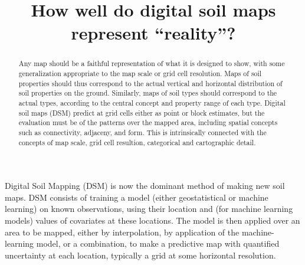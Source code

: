 \documentclass[soil, manuscript]{copernicus}
\begin{document}
\title{How well do digital soil maps represent ``reality''?}








\received{}
\pubdiscuss{} %
\revised{}
\accepted{}
\published{}



\maketitle
\tableofcontents

\newpage
\begin{abstract}
Any map should be a faithful representation of what it is designed to show, with some generalization appropriate to the map scale or grid cell resolution.
%
Maps of soil properties should thus correspond to the actual vertical and horizontal distribution of soil properties on the ground.
%
Similarly, maps of soil types should correspond to the actual types, according to the central concept and property range of each type.
%
Digital soil maps (DSM) predict at grid cells either as point or block estimates, but the evaluation must be of the patterns over the mapped area, including spatial concepts such as connectivity, adjaceny, and form.
%
This is intrinsically connected with the concepts of map scale, grid cell resultion, categorical and cartographic detail.
\end{abstract}

\newpage
\introduction  %

\par
Digital Soil Mapping (DSM) is now the dominant method of making new soil maps.
%
DSM consists of training a model (either geostatistical or machine learning) on known observations, using their location and (for machine learning models) values of covariates at these locations.
%
The model is then applied over an area to be mapped, either by interpolation, by application of the machine-learning model, or a combination, to make a predictive map with quantified uncertainty at each location, typically a grid at some horizontal resolution.
\end{document}

